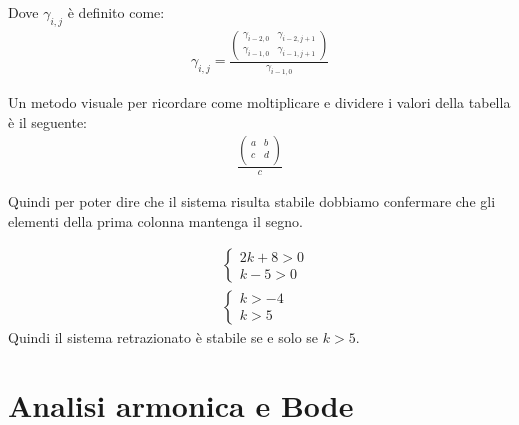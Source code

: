 \documentclass{article}
\begin{document}
  Dove $\gamma_{i, j}$ \`e definito come:
  \begin{align}
    \gamma_{i, j} = \frac{
      \begin{pmatrix}
        \gamma_{i-2, 0} & \gamma_{i-2, j+1} \\
        \gamma_{i-1, 0} & \gamma_{i-1, j+1}
      \end{pmatrix}
    }{\gamma_{i-1, 0}}
  \end{align}


  Un metodo visuale per ricordare come moltiplicare e dividere i valori della tabella \`e il seguente:
  \begin{align}
    \frac{
      \begin{pmatrix}
        a & b \\
        c & d \\
      \end{pmatrix}
    }{c}
  \end{align}


  Quindi per poter dire che il sistema risulta stabile dobbiamo confermare che gli elementi della 
  prima colonna mantenga il segno.

  \begin{align}
    &\begin{cases}
      2k + 8 > 0 \\
      k-5 > 0
    \end{cases}
    \\
    &\begin{cases}
      k > -4 \\
      k > 5
    \end{cases}
  \end{align}
  Quindi il sistema retrazionato \`e stabile se e solo se $k > 5$.




  \section{Analisi armonica e Bode}
\end{document}
